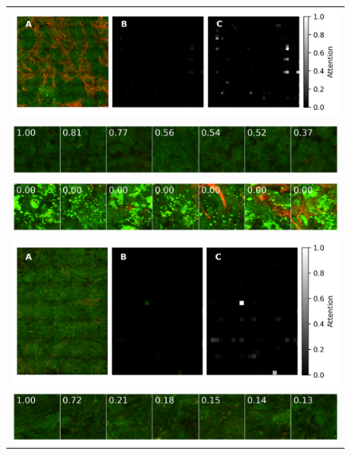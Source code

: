 \begin{figure}
    \centering
    \begin{tabularx}{\linewidth}{c}
        \includegraphics[width=\linewidth]{pediatric-brain-tumours/images/PMC_HHG_36_Hersenen_I-05_8x8_200slow-summary.png} \\
        \includegraphics[width=\linewidth]{pediatric-brain-tumours/images/PMC_HHG_36_Hersenen_I-05_8x8_200slow-tiles.png} \\
        \includegraphics[width=\linewidth]{pediatric-brain-tumours/images/PMC_HHG_36_Hersenen_I-05_8x8_200slow-tiles-low-a.png} \\
        \midrule
        \includegraphics[width=\linewidth]{pediatric-brain-tumours/images/PMC_HHG_32_Hersenen_I-05_5x7_200slow-summary.png} \\
        \includegraphics[width=\linewidth]{pediatric-brain-tumours/images/PMC_HHG_32_Hersenen_I-05_5x7_200slow-tiles.png} \\

\end{tabularx}
\end{figure}
